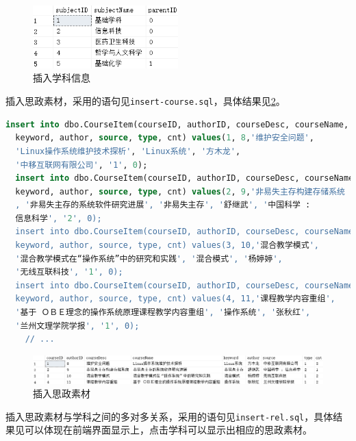 \documentclass[11pt]{article}
\begin{document}
  \begin{figure}[h]
    \centering
    \includegraphics[width=0.5\textwidth]{insert-subject.png}
    \caption{插入学科信息}
    \label{fig:insert-subject}
  \end{figure}

  插入思政素材，采用的语句见\verb|insert-course.sql|，具体结果见\ref{fig:insert-course}。

  \begin{file}
    \begin{lstlisting}[language=sql]
  insert into dbo.CourseItem(courseID, authorID, courseDesc, courseName, 
  keyword, author, source, type, cnt) values(1, 8,'维护安全问题', 
  'Linux操作系统维护技术探析', 'Linux系统', '方木龙', 
  '中移互联网有限公司', '1', 0);
  insert into dbo.CourseItem(courseID, authorID, courseDesc, courseName, 
  keyword, author, source, type, cnt) values(2, 9,'非易失主存构建存储系统
  , '非易失主存的系统软件研究进展', '非易失主存', '舒继武', '中国科学 : 
  信息科学', '2', 0);
  insert into dbo.CourseItem(courseID, authorID, courseDesc, courseName, 
  keyword, author, source, type, cnt) values(3, 10,'混合教学模式', 
  '混合教学模式在“操作系统”中的研究和实践', '混合模式', '杨婷婷', 
  '无线互联科技', '1', 0);
  insert into dbo.CourseItem(courseID, authorID, courseDesc, courseName, 
  keyword, author, source, type, cnt) values(4, 11,'课程教学内容重组', 
  '基于 ＯＢＥ理念的操作系统原理课程教学内容重组', '操作系统', '张秋红', 
  '兰州文理学院学报', '1', 0);
    // ...
    \end{lstlisting}
  \end{file}

  \begin{figure}[h]
    \centering
    \includegraphics[width=\textwidth]{insert-course.png}
    \caption{插入思政素材}
    \label{fig:insert-course}
  \end{figure}

  插入思政素材与学科之间的多对多关系，采用的语句见\verb|insert-rel.sql|，具体结果见可以体现在前端界面显示上，点击学科可以显示出相应的思政素材。
\end{document}
